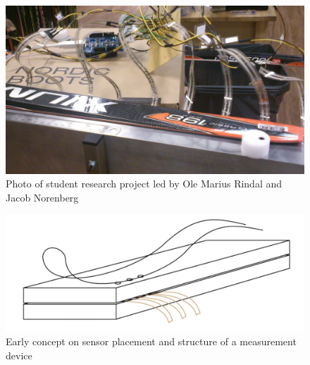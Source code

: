 \begin{figure}[!b]
    \centering
    \includegraphics[scale=0.12]{figures/prototype2.jpeg}
    \caption{Photo of student research project led by Ole Marius Rindal and Jacob Norenberg}
    \label{fig:earlyprototype}
\end{figure}

\begin{figure}[!b]
    \centering
    \includegraphics[scale=0.32]{figures/earlyconcept.png}
    \caption{Early concept on sensor placement and structure of a measurement device}
    \label{fig:earlyconcept}
\end{figure}

